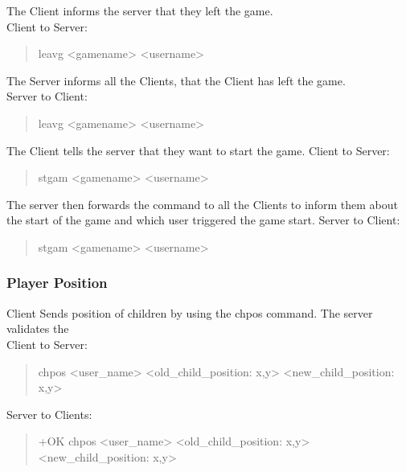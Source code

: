 \documentclass[a4paper,11pt]{article}
\begin{document}
\noindent
The Client informs the server that they left the game.\\
Client to Server:
\begin{quote}
  leavg <gamename> <username>
\end{quote}

\noindent
The Server informs all the Clients, that the Client has left the game.\\
Server to Client:
\begin{quote}
  leavg <gamename> <username>
\end{quote}

\noindent
The Client tells the server that they want to start the game.
Client to Server:
\begin{quote}
  stgam <gamename> <username>
\end{quote}

\noindent
The server then forwards the command to all the Clients to inform them about the start of the game and which user triggered the game start.
Server to Client:
\begin{quote}
  stgam <gamename> <username>
\end{quote}



\subsubsection{Player Position}
Client Sends position of children by using the chpos command. The server validates the \\
Client to Server:
\begin{quote}
  chpos <user\_name> <old\_child\_position: x,y> <new\_child\_position: x,y>
\end{quote}
\noindent
Server to Clients:
\begin{quote}
  +OK chpos <user\_name> <old\_child\_position: x,y> <new\_child\_position: x,y>
\end{quote}
\clearpage  
\end{document}
